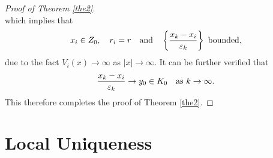 \documentclass[reqno, 11pt]{amsart} %
\numberwithin{equation}{section}
\begin{document}
\begin{proof}[Proof of Theorem \ref{the2}]
\begin{equation*}
		\end{equation*}
		which implies that
		\begin{equation*}
			x_{i}\in Z_{0},\quad r_{i}=r \quad \hbox{and} \quad \left\lbrace\frac{x_{k}-x_{i}}{\varepsilon_{k}} \right\rbrace~  \hbox{bounded},
		\end{equation*}
		due to the fact $V_{i}(x)\rightarrow\infty$ as $|x|\rightarrow\infty$. It can be further verified that
		\begin{equation*}
			\frac{x_{k}-x_{i}}{\varepsilon_{k}} \rightarrow y_{0}\in K_{0}\quad\hbox{as $k\rightarrow\infty$}.
		\end{equation*}
		This therefore completes the proof of Theorem \ref{the2}.
	\end{proof}
	
	
	\section{Local Uniqueness}\label{sec 4}
	
\end{document}
